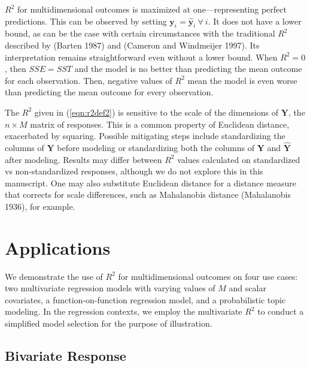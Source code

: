 \(R^2\) for multidimensional outcomes is maximized at one---representing perfect predictions. This can be observed by setting \(\boldsymbol{y}_i = \hat{\boldsymbol{y}}_i\ \forall\ i\). It does not have a lower bound, as can be the case with certain circumstances with the traditional \(R^2\) described by (Barten 1987) and (Cameron and Windmeijer 1997). Its interpretation remains straightforward even without a lower bound. When \(R^2 = 0\), then \(SSE = SST\) and the model is no better than predicting the mean outcome for each observation. Then, negative values of \(R^2\) mean the model is even worse than predicting the mean outcome for every observation.

The \(R^2\) given in (\ref{eqn:r2def2}) is sensitive to the scale of the dimensions of \(\boldsymbol{Y}\), the \(n\times M\) matrix of responses. This is a common property of Euclidean distance, exacerbated by squaring. Possible mitigating steps include standardizing the columns of \(\boldsymbol{Y}\) before modeling or standardizing both the columns of \(\boldsymbol{Y}\) and \(\hat{\boldsymbol{Y}}\) after modeling. Results may differ between \(R^2\) values calculated on standardized vs non-standardized responses, although we do not explore this in this manuscript. One may also substitute Euclidean distance for a distance measure that corrects for scale differences, such as Mahalanobis distance (Mahalanobis 1936), for example.

\hypertarget{applications}{%
\section{Applications}\label{applications}}

We demonstrate the use of \(R^2\) for multidimensional outcomes on four use cases: two multivariate regression models with varying values of \(M\) and scalar covariates, a function-on-function regression model, and a probabilistic topic modeling. In the regression contexts, we employ the multivariate \(R^2\) to conduct a simplified model selection for the purpose of illustration.

\hypertarget{bivariate-response}{%
\subsection{Bivariate Response}\label{bivariate-response}}

